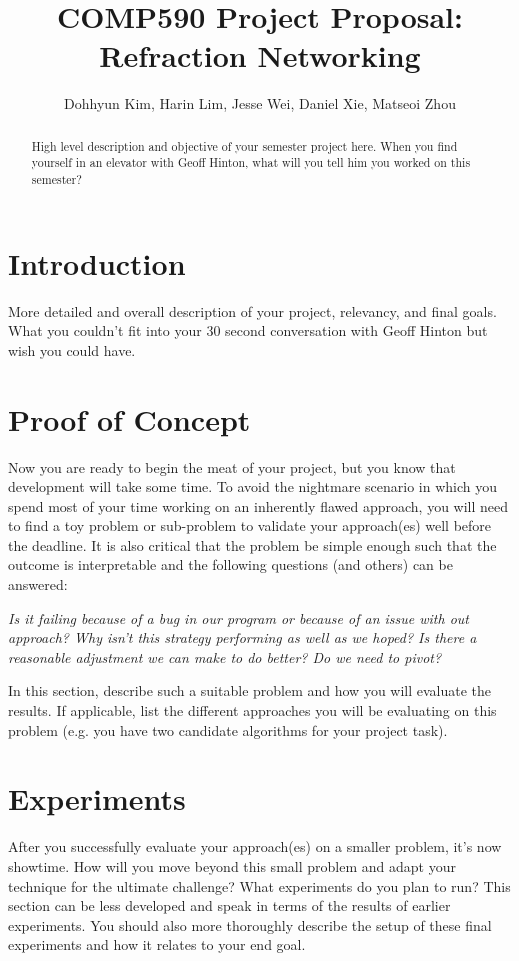 \documentclass{article} %
\title{COMP590 Project Proposal: Refraction Networking}
\author{
Dohhyun Kim,
Harin Lim,
Jesse Wei,
Daniel Xie,
Matseoi Zhou
}
\begin{document}
\maketitle

\begin{abstract}
High level description and objective of your semester project here. When you find yourself in an elevator with Geoff Hinton, what will you tell him you worked on this semester?
\end{abstract}

\section{Introduction}
More detailed and overall description of your project, relevancy, and final goals. What you couldn't fit into your 30 second conversation with Geoff Hinton but wish you could have.

\section{Proof of Concept}
Now you are ready to begin the meat of your project, but you know that development will take some time. To avoid the nightmare scenario in which you spend most of your time working on an inherently flawed approach, you will need to find a toy problem or sub-problem to validate your approach(es) well before the deadline. It is also critical that the problem be simple enough such that the outcome is interpretable and the following questions (and others) can be answered:

\textit{Is it failing because of a bug in our program or because of an issue with out approach? Why isn't this strategy performing as well as we hoped? Is there a reasonable adjustment we can make to do better? Do we need to pivot?}

In this section, describe such a suitable problem and how you will evaluate the results. If applicable, list the different approaches you will be evaluating on this problem (e.g. you have two candidate algorithms for your project task).

\section{Experiments}

After you successfully evaluate your approach(es) on a smaller problem, it's now showtime. How will you move beyond this small problem and adapt your technique for the ultimate challenge? What experiments do you plan to run? This section can be less developed and speak in terms of the results of earlier experiments. You should also more thoroughly describe the setup of these final experiments and how it relates to your end goal.
\end{document}
